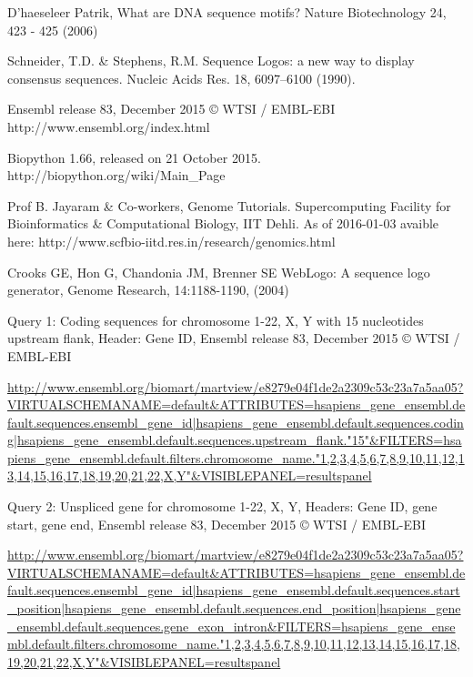 \documentclass[10pt,letterpaper]{article}
\begin{document}
%
%
% 
\begin{thebibliography}{10}

D'haeseleer Patrik, What are DNA sequence motifs? Nature Biotechnology 24, 423 - 425 (2006)

Schneider, T.D. \& Stephens, R.M. Sequence Logos: a new way to display consensus sequences. Nucleic Acids Res. 18, 6097–6100 (1990).

Ensembl release 83, December 2015 © WTSI / EMBL-EBI
http://www.ensembl.org/index.html

Biopython 1.66, released on 21 October 2015.
http://biopython.org/wiki/Main\_Page

Prof B. Jayaram \& Co-workers, Genome Tutorials. Supercomputing Facility for Bioinformatics \& Computational Biology, IIT Dehli.
As of 2016-01-03 avaible here:
http://www.scfbio-iitd.res.in/research/genomics.html

Crooks GE, Hon G, Chandonia JM, Brenner SE WebLogo: A sequence logo generator, Genome Research, 14:1188-1190, (2004)

Query 1: Coding sequences for chromosome 1-22, X, Y with 15 nucleotides upstream flank, Header: Gene ID, Ensembl release 83, December 2015 © WTSI / EMBL-EBI

\url{http://www.ensembl.org/biomart/martview/e8279e04f1de2a2309c53c23a7a5aa05?VIRTUALSCHEMANAME=default&ATTRIBUTES=hsapiens_gene_ensembl.default.sequences.ensembl_gene_id|hsapiens_gene_ensembl.default.sequences.coding|hsapiens_gene_ensembl.default.sequences.upstream_flank."15"&FILTERS=hsapiens_gene_ensembl.default.filters.chromosome_name."1,2,3,4,5,6,7,8,9,10,11,12,13,14,15,16,17,18,19,20,21,22,X,Y"&VISIBLEPANEL=resultspanel}

Query 2: Unspliced gene for chromosome 1-22, X, Y, Headers: Gene ID, gene start, gene end, Ensembl release 83, December 2015 © WTSI / EMBL-EBI

\url{http://www.ensembl.org/biomart/martview/e8279e04f1de2a2309c53c23a7a5aa05?VIRTUALSCHEMANAME=default&ATTRIBUTES=hsapiens_gene_ensembl.default.sequences.ensembl_gene_id|hsapiens_gene_ensembl.default.sequences.start_position|hsapiens_gene_ensembl.default.sequences.end_position|hsapiens_gene_ensembl.default.sequences.gene_exon_intron&FILTERS=hsapiens_gene_ensembl.default.filters.chromosome_name."1,2,3,4,5,6,7,8,9,10,11,12,13,14,15,16,17,18,19,20,21,22,X,Y"&VISIBLEPANEL=resultspanel}


\end{thebibliography}
\end{document}

